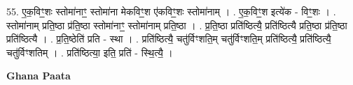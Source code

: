 \documentclass[17pt]{extarticle}
\begin{document}
55. ए॒क॒विꣳ॒॒शः स्तोमा॑नाꣳ॒॒ स्तोमा॑ना मेकविꣳ॒॒श ए॑कविꣳ॒॒शः स्तोमा॑नाम् । . ए॒क॒विꣳ॒॒श इत्ये॑क - विꣳ॒॒शः । . स्तोमा॑नाम् प्रति॒ष्ठा प्र॑ति॒ष्ठा स्तोमा॑नाꣳ॒॒ स्तोमा॑नाम् प्रति॒ष्ठा । . प्र॒ति॒ष्ठा प्रति॑ष्ठित्यै॒ प्रति॑ष्ठित्यै प्रति॒ष्ठा प्र॑ति॒ष्ठा प्रति॑ष्ठित्यै । . प्र॒ति॒ष्ठेति॑ प्रति - स्था । . प्रति॑ष्ठित्यै॒ चतु॑र्विꣳशति॒म् चतु॑र्विꣳशति॒म् प्रति॑ष्ठित्यै॒ प्रति॑ष्ठित्यै॒ चतु॑र्विꣳशतिम् । . प्रति॑ष्ठित्या॒ इति॒ प्रति॑ - स्थि॒त्यै॒ । \newline

\textbf{Ghana Paata } \newline
\end{document}
